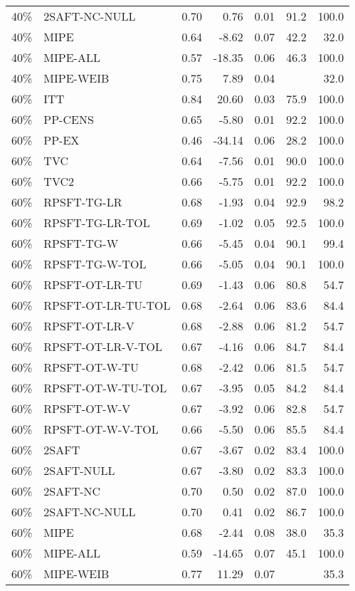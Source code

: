 \begin{table}[ht]
{\begin{tabular}{llrrrrr}
  40\% & 2SAFT-NC-NULL & 0.70 & 0.76 & 0.01 & 91.2 & 100.0 \\ 
  40\% & MIPE & 0.64 & -8.62 & 0.07 & 42.2 & 32.0 \\ 
  40\% & MIPE-ALL & 0.57 & -18.35 & 0.06 & 46.3 & 100.0 \\ 
  40\% & MIPE-WEIB & 0.75 & 7.89 & 0.04 &  & 32.0 \\ 
   \hline
60\% & ITT & 0.84 & 20.60 & 0.03 & 75.9 & 100.0 \\ 
  60\% & PP-CENS & 0.65 & -5.80 & 0.01 & 92.2 & 100.0 \\ 
  60\% & PP-EX & 0.46 & -34.14 & 0.06 & 28.2 & 100.0 \\ 
  60\% & TVC & 0.64 & -7.56 & 0.01 & 90.0 & 100.0 \\ 
  60\% & TVC2 & 0.66 & -5.75 & 0.01 & 92.2 & 100.0 \\ 
   \hline
60\% & RPSFT-TG-LR & 0.68 & -1.93 & 0.04 & 92.9 & 98.2 \\ 
  60\% & RPSFT-TG-LR-TOL & 0.69 & -1.02 & 0.05 & 92.5 & 100.0 \\ 
  60\% & RPSFT-TG-W & 0.66 & -5.45 & 0.04 & 90.1 & 99.4 \\ 
  60\% & RPSFT-TG-W-TOL & 0.66 & -5.05 & 0.04 & 90.1 & 100.0 \\ 
  60\% & RPSFT-OT-LR-TU & 0.69 & -1.43 & 0.06 & 80.8 & 54.7 \\ 
  60\% & RPSFT-OT-LR-TU-TOL & 0.68 & -2.64 & 0.06 & 83.6 & 84.4 \\ 
  60\% & RPSFT-OT-LR-V & 0.68 & -2.88 & 0.06 & 81.2 & 54.7 \\ 
  60\% & RPSFT-OT-LR-V-TOL & 0.67 & -4.16 & 0.06 & 84.7 & 84.4 \\ 
   \hline
60\% & RPSFT-OT-W-TU & 0.68 & -2.42 & 0.06 & 81.5 & 54.7 \\ 
  60\% & RPSFT-OT-W-TU-TOL & 0.67 & -3.95 & 0.05 & 84.2 & 84.4 \\ 
  60\% & RPSFT-OT-W-V & 0.67 & -3.92 & 0.06 & 82.8 & 54.7 \\ 
  60\% & RPSFT-OT-W-V-TOL & 0.66 & -5.50 & 0.06 & 85.5 & 84.4 \\ 
   \hline
60\% & 2SAFT & 0.67 & -3.67 & 0.02 & 83.4 & 100.0 \\ 
  60\% & 2SAFT-NULL & 0.67 & -3.80 & 0.02 & 83.3 & 100.0 \\ 
  60\% & 2SAFT-NC & 0.70 & 0.50 & 0.02 & 87.0 & 100.0 \\ 
  60\% & 2SAFT-NC-NULL & 0.70 & 0.41 & 0.02 & 86.7 & 100.0 \\ 
  60\% & MIPE & 0.68 & -2.44 & 0.08 & 38.0 & 35.3 \\ 
  60\% & MIPE-ALL & 0.59 & -14.65 & 0.07 & 45.1 & 100.0 \\ 
  60\% & MIPE-WEIB & 0.77 & 11.29 & 0.07 &  & 35.3 \\ 
   \hline
\end{tabular}
}
\end{table}
